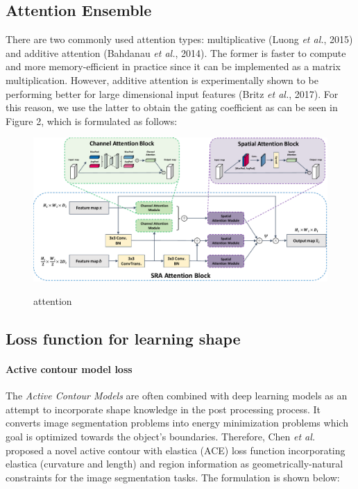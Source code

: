 \documentclass{ieeeaccess}
\begin{document}
  \subsection{Attention Ensemble}
  
  There are two commonly used attention types: multiplicative (Luong \emph{et al.}, 2015) and additive attention (Bahdanau \emph{et al.}, 2014). The former is faster to compute and more memory-efficient in practice since it can be implemented as a
  matrix multiplication. However, additive attention is experimentally shown to be performing better for large dimensional input features (Britz \emph{et al.}, 2017). For this reason, we use the latter to obtain the gating coefficient as can be seen in Figure 2, which is formulated as follows:
  
  \begin{figure}[htbp]
  \small
  \centering
  \includegraphics[width=1\textwidth]{figure/Attention.pdf}
  \label{fig:attention}
  \caption{attention}
  \end{figure}
  
  
  \subsection{Loss function for learning shape}
  \paragraph{Active contour model loss}
  The \emph{Active Contour Models}\cite{Kass1988} are often combined with deep learning models as an attempt to incorporate shape knowledge in the post processing process.
  It converts image segmentation problems into energy minimization problems which goal is optimized towards the object's boundaries.
  Therefore, Chen \emph{et al.} proposed a novel active contour with elastica (ACE) loss function\cite{aceloss} incorporating elastica (curvature and length) and region information as geometrically-natural constraints
  for the image segmentation tasks. The formulation is shown below:
  
\end{document}
